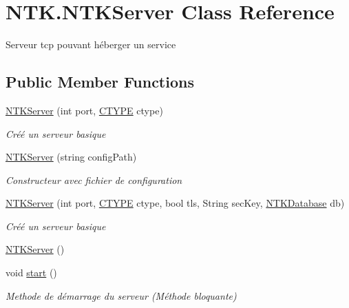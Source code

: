 \hypertarget{class_n_t_k_1_1_n_t_k_server}{}\section{N\+T\+K.\+N\+T\+K\+Server Class Reference}
\label{class_n_t_k_1_1_n_t_k_server}


Serveur tcp pouvant héberger un service  


\subsection*{Public Member Functions}
\begin{DoxyCompactItemize}
\item 
\mbox{\hyperlink{class_n_t_k_1_1_n_t_k_server_a32ce62eba342ab051bce35ccc0c0add6}{N\+T\+K\+Server}} (int port, \mbox{\hyperlink{namespace_n_t_k_a8fa28c7c4270bbb81ee96b4f632fdbec}{C\+T\+Y\+PE}} ctype)
\begin{DoxyCompactList}\small\item\em Créé un serveur basique \end{DoxyCompactList}\item 
\mbox{\hyperlink{class_n_t_k_1_1_n_t_k_server_a2a7d90608e8ba206e00af847158ce413}{N\+T\+K\+Server}} (string config\+Path)
\begin{DoxyCompactList}\small\item\em Constructeur avec fichier de configuration \end{DoxyCompactList}\item 
\mbox{\hyperlink{class_n_t_k_1_1_n_t_k_server_adbec0e1fa41f08f6c15b69a243f47fa2}{N\+T\+K\+Server}} (int port, \mbox{\hyperlink{namespace_n_t_k_a8fa28c7c4270bbb81ee96b4f632fdbec}{C\+T\+Y\+PE}} ctype, bool tls, String sec\+Key, \mbox{\hyperlink{class_n_t_k_1_1_database_1_1_n_t_k_database}{N\+T\+K\+Database}} db)
\begin{DoxyCompactList}\small\item\em Créé un serveur basique \end{DoxyCompactList}\item 
\mbox{\hyperlink{class_n_t_k_1_1_n_t_k_server_a0f4f0d0a4065e9982ea6a1c66a69aed3}{N\+T\+K\+Server}} ()
\item 
void \mbox{\hyperlink{class_n_t_k_1_1_n_t_k_server_a7590bf94a2e539571a154f16d65d6ea5}{start}} ()
\begin{DoxyCompactList}\small\item\em Methode de démarrage du serveur (Méthode bloquante) \end{DoxyCompactList}\item 

\end{DoxyCompactItemize}
